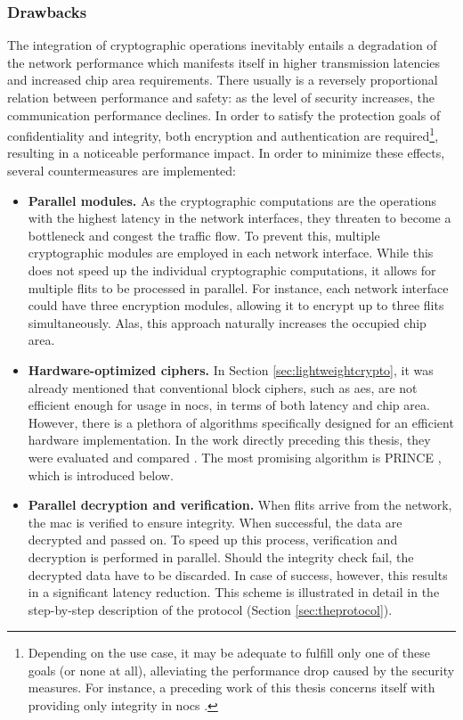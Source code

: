 \subsubsection{Drawbacks}\label{subsubsec:cryptodrawbacks}
The integration of cryptographic operations inevitably entails a degradation of the network performance which manifests itself in higher transmission
latencies and increased chip area requirements. There usually is a reversely proportional relation between performance and safety: as the level of security
increases, the communication performance declines. In order to satisfy the protection goals of confidentiality and integrity, both encryption and
authentication are required\footnote{Depending on the use case, it may be adequate to fulfill only one of these goals (or none at all), alleviating
the performance drop caused by the security measures. For instance, a preceding work of this thesis concerns itself with providing only integrity in
\glspl{noc} \cite{moriam18activeattackers}.}, resulting in a noticeable performance impact. In order to minimize these effects, several countermeasures
are implemented:
\begin{itemize}
    \item \textbf{Parallel modules.} As the cryptographic computations are the operations with the highest latency in the network interfaces, they
        threaten to become a bottleneck and congest the traffic flow. To prevent this, multiple cryptographic modules are employed in each network
        interface. While this does not speed up the individual cryptographic computations, it allows for multiple flits to be processed in parallel. For
        instance, each network interface could have three encryption modules, allowing it to encrypt up to three flits simultaneously. Alas, this
        approach naturally increases the occupied chip area.
    \item \textbf{Hardware-optimized ciphers.} In Section \ref{sec:lightweightcrypto}, it was already mentioned that conventional block ciphers, such
        as \gls{aes}, are not efficient enough for usage in \glspl{noc}, in terms of both latency and chip area. However, there is a plethora of
        algorithms specifically designed for an efficient hardware implementation. In the work directly preceding this thesis, they were evaluated and
        compared \cite{harttung17lightweightcrypto}. The most promising algorithm is PRINCE \cite{borghoff12prince}, which is introduced below.
    \item \textbf{Parallel decryption and verification.} When flits arrive from the network, the \gls{mac} is verified to ensure integrity. When
        successful, the data are decrypted and passed on. To speed up this process, verification and decryption is performed in parallel. Should the
        integrity check fail, the decrypted data have to be discarded. In case of success, however, this results in a significant latency reduction.
        This scheme is illustrated in detail in the step-by-step description of the protocol (Section \ref{sec:theprotocol}).
\end{itemize}

